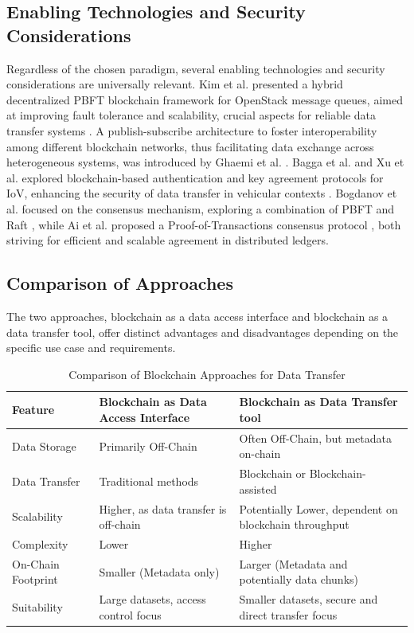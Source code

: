 \documentclass[10pt]{llncs}
\begin{document}
\subsection{Enabling Technologies and Security Considerations}

Regardless of the chosen paradigm, several enabling technologies and security considerations are universally relevant. 
Kim et al. presented a hybrid decentralized PBFT blockchain framework for OpenStack message queues, aimed at improving fault tolerance and scalability, 
crucial aspects for reliable data transfer systems \cite{kim2020hybrid}. 
A publish-subscribe architecture to foster interoperability among different blockchain networks, thus facilitating data exchange across heterogeneous systems, was introduced by Ghaemi et al. \cite{Ghaemi2021}. 
Bagga et al. and Xu et al. explored blockchain-based authentication and key agreement protocols for IoV, enhancing the security of data transfer in vehicular contexts \cite{Bagga2021,Xu2021}. 
Bogdanov et al. focused on the consensus mechanism, exploring a combination of PBFT and Raft \cite{Bogdanov2024}, while Ai et al. proposed a Proof-of-Transactions consensus protocol \cite{Ai2022}, 
both striving for efficient and scalable agreement in distributed ledgers. 

\subsection{Comparison of Approaches}

The two approaches, blockchain as a data access interface and blockchain as a data transfer tool, offer distinct advantages and disadvantages depending on the specific use case and requirements.

\begin{table}[h!]
\caption{Comparison of Blockchain Approaches for Data Transfer}
\label{tab:comparison}
\begin{tabular}{|p{20mm}|p{50mm}|p{50mm}|}
\hline
Feature & Blockchain as Data Access Interface & Blockchain as Data Transfer tool \\ \hline
Data Storage & Primarily Off-Chain & Often Off-Chain, but metadata on-chain \\ \hline
Data Transfer & Traditional methods & Blockchain or Blockchain-assisted \\ \hline
Scalability & Higher, as data transfer is off-chain & Potentially Lower, dependent on blockchain throughput \\ \hline
Complexity & Lower & Higher \\ \hline
On-Chain Footprint & Smaller (Metadata only) & Larger (Metadata and potentially data chunks) \\ \hline
Suitability & Large datasets, access control focus & Smaller datasets, secure and direct transfer focus \\ \hline
\end{tabular}

\end{table}
\end{document}
